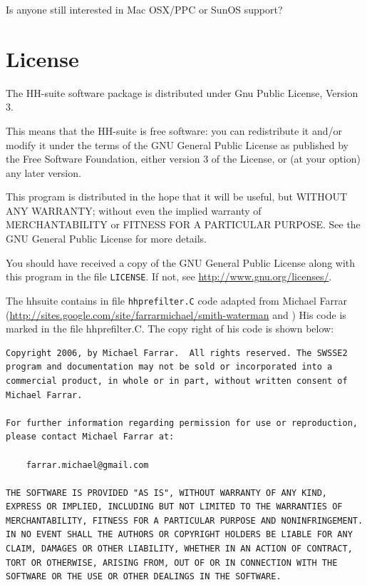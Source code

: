 \documentclass[11pt,a4paper]{article}
\begin{document}
Is anyone still interested in Mac OSX/PPC or SunOS support? 


\section{License}

The HH-suite software package is distributed under Gnu Public License, Version 3. 

This means that the HH-suite is free software: you can redistribute it and/or modify
it under the terms of the GNU General Public License as published by
the Free Software Foundation, either version 3 of the License, or
(at your option) any later version.

This program is distributed in the hope that it will be useful,
but WITHOUT ANY WARRANTY; without even the implied warranty of
MERCHANTABILITY or FITNESS FOR A PARTICULAR PURPOSE.  See the
GNU General Public License for more details.

You should have received a copy of the GNU General Public License
along with this program in the file \verb`LICENSE`.  
If not, see \url{http://www.gnu.org/licenses/}.

The hhsuite contains in file \verb`hhprefilter.C` code adapted from Michael 
Farrar (\url{http://sites.google.com/site/farrarmichael/smith-waterman}
and \cite{Farrar:2007}) His code is marked in the file hhprefilter.C. 
The copy right of his code is shown below:

\begin{verbatim}
Copyright 2006, by Michael Farrar.  All rights reserved. The SWSSE2
program and documentation may not be sold or incorporated into a
commercial product, in whole or in part, without written consent of
Michael Farrar.

For further information regarding permission for use or reproduction, 
please contact Michael Farrar at:

    farrar.michael@gmail.com

THE SOFTWARE IS PROVIDED "AS IS", WITHOUT WARRANTY OF ANY KIND, 
EXPRESS OR IMPLIED, INCLUDING BUT NOT LIMITED TO THE WARRANTIES OF 
MERCHANTABILITY, FITNESS FOR A PARTICULAR PURPOSE AND NONINFRINGEMENT. 
IN NO EVENT SHALL THE AUTHORS OR COPYRIGHT HOLDERS BE LIABLE FOR ANY 
CLAIM, DAMAGES OR OTHER LIABILITY, WHETHER IN AN ACTION OF CONTRACT, 
TORT OR OTHERWISE, ARISING FROM, OUT OF OR IN CONNECTION WITH THE 
SOFTWARE OR THE USE OR OTHER DEALINGS IN THE SOFTWARE.
\end{verbatim}
\end{document}
